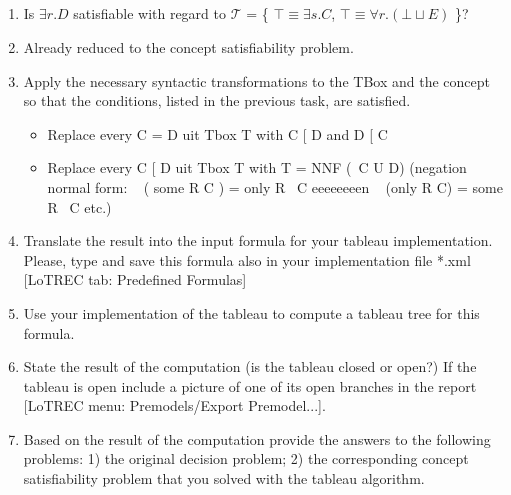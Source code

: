 \documentclass[11pt]{article} %
\begin{document}
\subsection{}


\begin{enumerate}
\item Is $\exists r.D$ satisfiable with regard to $\mathcal{T}$ = \{ $\top \equiv \exists s.C$, $\top \equiv \forall r.(\bot \sqcup E)$ \}?
\item Already reduced to the concept satisfiability problem. 
\item Apply the necessary syntactic transformations to the TBox and the concept so that the conditions, listed in the previous task, are satisfied.
\begin{itemize}
	\item 	Replace every C = D uit Tbox T with C [ D and D [ C
	\item Replace every C [ D uit Tbox T with T = NNF (~C U D) (negation normal form: ~ ( some R C ) = only R ~C   eeeeeeeen ~ (only R C) = some R ~C etc.)
\end{itemize}
\item Translate the result into the input formula for your tableau implementation. Please, type and save this formula also in your implementation file *.xml [LoTREC tab: Predefined Formulas]
\item Use your implementation of the tableau to compute a tableau tree for this formula.
\item State the result of the computation (is the tableau closed or open?) If the tableau is open include a picture of one of its open branches in the report [LoTREC menu: Premodels/Export Premodel...].
\item Based on the result of the computation provide the answers to the following problems: 1) the original decision problem; 2) the corresponding concept satisfiability problem that you solved with the tableau algorithm.
\end{enumerate}

\subsection{}
\end{document}
